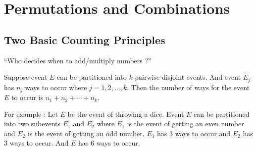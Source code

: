 


\section{Permutations and Combinations}
\subsection{Two Basic Counting Principles}
\begin{commentary}
``Who decides when to add/multiply numbers ?''
\end{commentary}
\begin{definition}
	Suppose event $E$ can be partitioned into $k$ pairwise disjoint events.
	And event $E_j$ has $n_j$ ways to occur where $j=1,2,\dots,k$.
	Then the number of ways for the event $E$ to occur is $n_1+n_2+\dotsb+n_k$.
\end{definition}
For example : Let $E$ be the event of throwing a dice. Event $E$ can be partitioned into two subevents $E_1$ and $E_2$ where $E_1$ is the event of getting an even number and $E_2$ is the event of getting an odd number. $E_1$ has $3$ ways to occur and $E_2$ has $3$ ways to occur. And $E$ has $6$ ways to occur.

